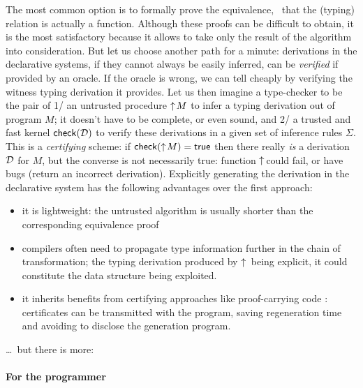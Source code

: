 \documentclass[9pt]{sigplanconf}
\begin{document}
The most common option is to formally prove the equivalence, \ie\ that
the (typing) relation is actually a function. Although these proofs
can be difficult to obtain, it is the most satisfactory because it
allows to take only the result of the algorithm into
consideration. But let us choose another path for a minute:
derivations in the declarative systems, if they cannot always be
easily inferred, can be \emph{verified} if provided by an oracle. If
the oracle is wrong, we can tell cheaply by verifying the witness
typing derivation it provides. Let us then imagine a type-checker to
be the pair of 1/ an untrusted procedure $\uparrow\!{M}$ to infer a typing
derivation out of program $M$; it doesn't have to be complete, or even
sound, and 2/ a trusted and fast kernel ${\text{\textsf{check}}}({\mathcal D})$ to verify these
derivations in a given set of inference rules $\Sigma$. This is a
\emph{certifying} scheme: %
if ${\text{\textsf{check}}}({\uparrow\!{M}}) = \text{\textsf{true}}$ then there really \emph{is} a
derivation $\mathcal D$ for $M$, but the converse is not necessarily true:
function $\uparrow\!{}\!\!$ could fail, or have bugs (return an incorrect
derivation). Explicitly generating the derivation in the declarative
system has the following advantages over the first approach:
\begin{itemize}
\item it is lightweight: the untrusted algorithm is usually shorter
  than the corresponding equivalence proof
\item compilers often need to propagate type information further in
  the chain of transformation; the typing derivation produced by
  $\uparrow\!{}$ being explicit, it could constitute the data structure
  being exploited.
\item it inherits benefits from certifying approaches like
  proof-carrying code \cite{necula1997proof}: certificates can be
  transmitted with the program, saving regeneration time and avoiding
  to disclose the generation program.
\end{itemize}
\ldots\ but there is more:

\paragraph{For the programmer}
\end{document}
